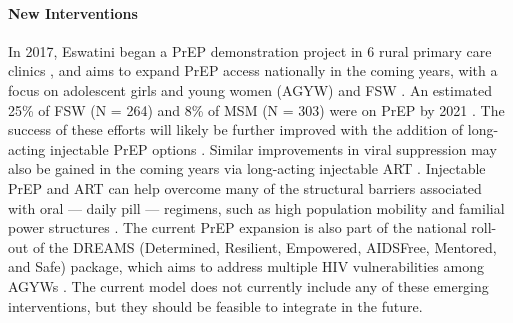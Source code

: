 \paragraph{New Interventions}
In 2017, Eswatini began a PrEP demonstration project
in 6 rural primary care clinics \cite{NERCHA2018,Barnighausen2019},
and aims to expand PrEP access nationally in the coming years,
with a focus on adolescent girls and young women (AGYW) and FSW \cite{EswCOP21}.
An estimated 25\% of FSW (N = 264) and 8\% of MSM (N = 303) were on PrEP by 2021 \cite{EswIBBS2022}.
The success of these efforts will likely be further improved
with the addition of long-acting injectable PrEP options \cite{Clement2020,Smith2023}.
Similar improvements in viral suppression may also be gained in the coming years
via long-acting injectable ART \cite{Thoueille2022}.
Injectable PrEP and ART can help overcome
many of the structural barriers associated with oral --- \ie daily pill --- regimens,
such as high population mobility and familial power structures
\cite{Dlamini-Simelane2017,Horter2019,Becker2020,Barnighausen2020}.
The current PrEP expansion is also part of the national roll-out of the DREAMS
(Determined, Resilient, Empowered, AIDSFree, Mentored, and Safe) package,
which aims to address multiple HIV vulnerabilities among AGYWs \cite{Saul2018,EswCOP21}.
The current model does not currently include any of these emerging interventions,
but they should be feasible to integrate in the future.
